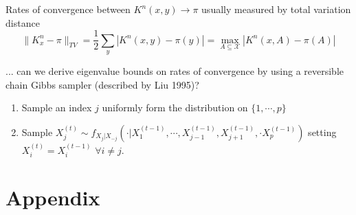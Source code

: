 \documentclass{article}%
\theoremstyle{definition}
\begin{document}
Rates of convergence between $K^n(x,y) \rightarrow \pi$ usually measured by total variation distance
\begin{equation}
\|K_x^n - \pi \|_{TV} = \frac{1}{2}\sum_y | K^n(x,y) - \pi(y)| = \max_{A \subseteq \mathcal{X}} |K^n(x,A) - \pi(A) |
\end{equation}

... can we derive eigenvalue bounds on rates of convergence by using a reversible chain Gibbs sampler (described by Liu 1995)?

\begin{enumerate}
    \item Sample an index $j$ uniformly form the distribution on $\{1, \cdots, p\}$
    \item Sample $X_j^{(t)} \sim f_{X_j |X_{-j}}(\cdot | X_1^{(t-1)},\cdots, X_{j-1}^{(t-1)},  X_{j+1}^{(t-1)}, \cdot  X_{p}^{(t-1)})$ setting $X_i^{(t)}=X_i^{(t-1)}$ $\forall i \neq j$.
\end{enumerate}


{}

\clearpage
\section{Appendix}
\label{sec:appx}
\end{document}
